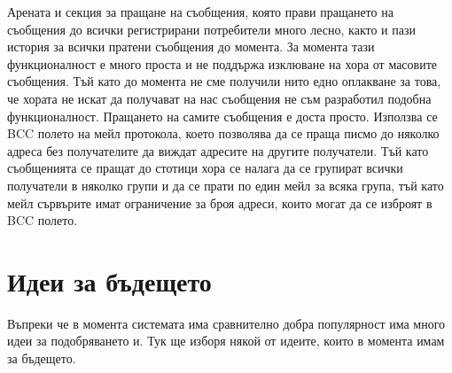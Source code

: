 \documentclass[a4paper,12pt]{article}
\begin{document}
  Арената и секция за пращане на съобщения, която прави пращането на съобщения до всички регистрирани потребители много лесно, както и пази история за всички пратени съобщения до момента. За момента тази функционалност е много проста и не поддържа изклюване на хора от масовите съобщения. Тъй като до момента не сме получили нито едно оплакване за това, че хората не искат да получават на нас съобщения не съм разработил подобна функционалност. Пращането на самите съобщения е доста просто. Използва се BCC полето на мейл протокола, което позволява да се праща писмо до няколко адреса без получателите да виждат адресите на другите получатели. Тъй като съобщенията се пращат до стотици хора се налага да се групират всички получатели в няколко групи и да се прати по един мейл за всяка група, тъй като мейл сървърите имат ограничение за броя адреси, които могат да се изброят в BCC полето.
  
  \section{Идеи за бъдещето}
    Въпреки че в момента системата има сравнително добра популярност има много идеи за подобряването и. Тук ще изборя някой от идеите, които в момента имам за бъдещето.
    
\end{document}
